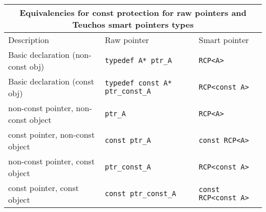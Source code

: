 \begin{tabular}{|l|l|l|}
%
\multicolumn{3}{c}{\textbf{Equivalencies for const protection for raw
pointers and Teuchos smart pointers types}} \\
\hline
Description
& Raw pointer 
& Smart pointer \\
\hline
\hline
Basic declaration (non-const obj)
& {}\texttt{typedef A* ptr\_A}
& {}\texttt{RCP<A>} \\
\hline
Basic declaration (const obj)
& {}\texttt{typedef const A* ptr\_const\_A}
& {}\texttt{RCP<const A>} \\
\hline
\hline
non-const pointer, non-const object
& {}\texttt{ptr\_A}
& {}\texttt{RCP<A>} \\
\hline
const pointer, non-const object
& {}\texttt{const ptr\_A}
& {}\texttt{const RCP<A>} \\
\hline
non-const pointer, const object
& {}\texttt{ptr\_const\_A}
& {}\texttt{RCP<const A>} \\
\hline
const pointer, const object
& {}\texttt{const ptr\_const\_A}
& {}\texttt{const RCP<const A>} \\
\hline
\end{tabular}
